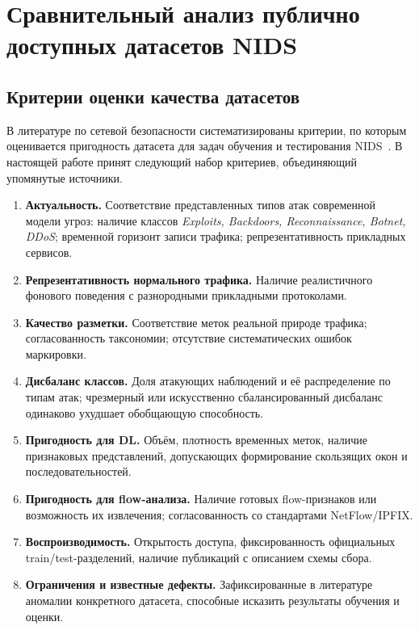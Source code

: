 
\section{Сравнительный анализ публично доступных датасетов NIDS}

\subsection{Критерии оценки качества датасетов}

В литературе по сетевой безопасности систематизированы критерии, по которым
оценивается пригодность датасета для задач обучения и тестирования
NIDS~\cite{gharib2016evalframework, sharafaldin2018toward, ferrag2020dlcyber}.
В настоящей работе принят следующий набор критериев, объединяющий упомянутые
источники.

\begin{enumerate}[label=K\arabic*., leftmargin=2.5em]
    \item \textbf{Актуальность.} Соответствие представленных типов атак
    современной модели угроз: наличие классов \emph{Exploits, Backdoors,
    Reconnaissance, Botnet, DDoS}; временной горизонт записи трафика;
    репрезентативность прикладных сервисов.
    \item \textbf{Репрезентативность нормального трафика.} Наличие
    реалистичного фонового поведения с разнородными прикладными протоколами.
    \item \textbf{Качество разметки.} Соответствие меток реальной природе
    трафика; согласованность таксономии; отсутствие систематических ошибок
    маркировки.
    \item \textbf{Дисбаланс классов.} Доля атакующих наблюдений и её
    распределение по типам атак; чрезмерный или искусственно сбалансированный
    дисбаланс одинаково ухудшает обобщающую способность.
    \item \textbf{Пригодность для DL.} Объём, плотность временных меток,
    наличие признаковых представлений, допускающих формирование скользящих
    окон и последовательностей.
    \item \textbf{Пригодность для flow-анализа.} Наличие готовых flow-признаков
    или возможность их извлечения; согласованность со стандартами NetFlow/IPFIX.
    \item \textbf{Воспроизводимость.} Открытость доступа, фиксированность
    официальных train/test-разделений, наличие публикаций с описанием схемы
    сбора.
    \item \textbf{Ограничения и известные дефекты.} Зафиксированные в
    литературе аномалии конкретного датасета, способные исказить результаты
    обучения и оценки.
\end{enumerate}

